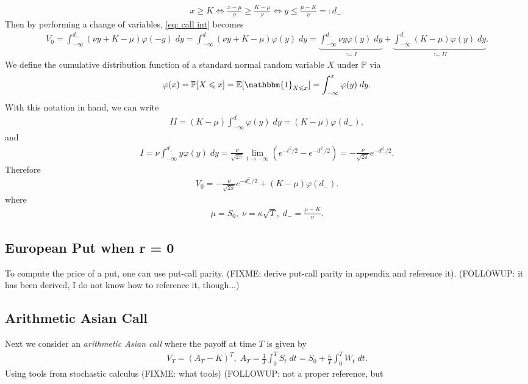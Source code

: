 \documentclass[reqno]{amsart}
\begin{document}
\begin{align}
	 x \ge K \Longleftrightarrow \frac{x-\mu}{\nu} \ge \frac{K - \mu}{\nu} \Longleftrightarrow y \le \frac{\mu - K}{\nu} =: d_-.
\end{align}
Then by performing a change of variables, \eqref{eq: call int} becomes 
\begin{align}
	 V_0 = \int_{-\infty}^{d_-} (\nu y + K - \mu) \varphi(-y) \; dy = \int_{-\infty}^{d_-} (\nu y + K - \mu) \varphi(y) \; dy = \underbrace{\int_{-\infty}^{d_-} \nu y \varphi(y) \; dy}_{:= I} + \underbrace{\int_{-\infty}^{d_-}  (K-\mu)\varphi(y) \; dy}_{:= II}.
\end{align}
We define the cumulative distribution function of a standard normal random variable $X$ under $\mathbb{P}$ via 
\begin{align}
	 \varphi(x) = \mathbb{P}[X \le x] = \E[ \mathbbm{1}_{X \le x}] = \int_{-\infty}^x \varphi(y) \; dy.
\end{align}
With this notation in hand, we can write 
\begin{align}
	 II = (K-\mu) \int_{-\infty}^{d_-} \varphi(y) \; dy = (K-\mu) \varphi(d_-),
\end{align}
and 
\begin{align}
	 I = \nu \int_{-\infty}^{d_-} y \varphi(y) \; dy =  \frac{\nu}{\sqrt{2\pi}} \lim_{t \to -\infty} (e^{-t^2/2} - e^{-d_-^2/2}) = -\frac{\nu}{\sqrt{2\pi}} e^{-d_-^2/2}.
\end{align}
Therefore 
\begin{align}
	 V_0 =  -\frac{\nu}{\sqrt{2\pi}} e^{-d_-^2/2} + (K-\mu) \varphi(d_-).
\end{align}
where 
\begin{align}
	 \mu = S_0, \; \nu = \kappa \sqrt{T}, \; d_- = \frac{\mu - K}{\nu}.
\end{align}

\subsection{European Put when r = 0}
To compute the price of a put, one can use put-call parity.
(FIXME: derive put-call parity in appendix and reference it). 
(FOLLOWUP: it has been derived, I do not know how to reference it, though...)

\subsection{Arithmetic Asian Call}
Next we consider an \emph{arithmetic Asian call} where the payoff at time $T$ is given by 
\begin{align} \label{eq: asian}
	 V_T = (A_T - K)^T, \; A_T = \frac{1}{T}\int_0^T S_t \; dt = S_0 + \frac{\kappa}{T} \int_0^T W_t \; dt. 
\end{align}
Using tools from stochastic calculus (FIXME: what tools) (FOLLOWUP: not a proper reference, but 
\end{document}

